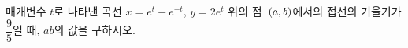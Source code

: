 매개변수 $t$로 나타낸 곡선 $x=e^t-e^{-t}$, $y=2e^t$ 위의 점~$(a{,}\mkern3mu\mathopen{}b)$에서의 접선의 기울기가 $\dfrac{9}{5}$일 때, $ab$의 값을 구하시오.
